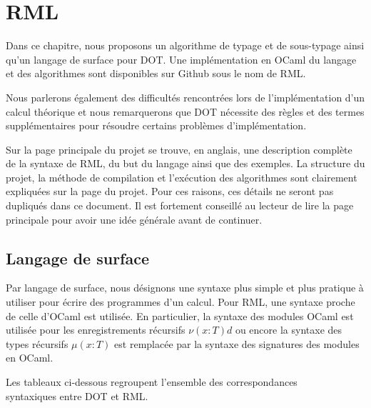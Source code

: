\chapter{RML}
\label{chapter:rml}

Dans ce chapitre, nous proposons un algorithme de typage et de sous-typage ainsi
qu'un langage de surface pour DOT. Une implémentation en OCaml du langage et des
algorithmes sont disponibles sur Github\cite{rml-github} sous le nom de RML.

Nous parlerons également des difficultés rencontrées lors de l'implémentation
d'un calcul théorique et nous remarquerons que DOT nécessite des règles et des termes
supplémentaires pour résoudre certains problèmes d'implémentation.


Sur la page principale du projet se trouve, en anglais, une description complète de la syntaxe de RML,
du but du langage ainsi que des exemples.
La structure du projet, la méthode de compilation et l'exécution des
algorithmes sont clairement expliquées sur la page du projet. Pour ces raisons,
ces détails ne seront pas dupliqués dans ce document.
Il est fortement conseillé au lecteur de lire la page principale pour avoir une
idée générale avant de continuer.

\section{Langage de surface}

Par langage de surface, nous désignons une syntaxe plus simple et plus pratique
à utiliser pour écrire des programmes d'un calcul. Pour RML, une syntaxe proche
de celle d'OCaml est utilisée. En particulier, la syntaxe des modules OCaml est utilisée pour les
enregistrements récursifs $\nu(x : T)d$ ou encore la syntaxe des types récursifs $\mu(x :
T)$ est remplacée par la syntaxe des signatures des modules en OCaml.

Les tableaux ci-dessous regroupent l'ensemble des correspondances \\ syntaxiques entre DOT et
RML.

